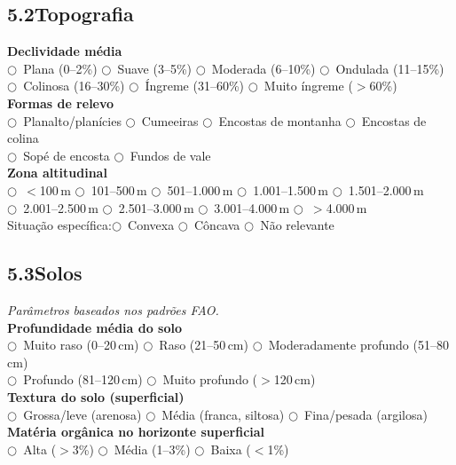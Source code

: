 \subsection{5.2\quad Topografia}

\noindent\textbf{Declividade média}\\
$\bigcirc$~Plana (0--2\%) \quad $\bigcirc$~Suave (3--5\%) \quad $\bigcirc$~Moderada (6--10\%) \quad $\bigcirc$~Ondulada (11--15\%)\\
$\bigcirc$~Colinosa (16--30\%) \quad $\bigcirc$~Íngreme (31--60\%) \quad $\bigcirc$~Muito íngreme ($>$60\%)\\[4pt]
\textbf{Formas de relevo}\\
$\bigcirc$~Planalto/planícies \quad $\bigcirc$~Cumeeiras \quad $\bigcirc$~Encostas de montanha \quad $\bigcirc$~Encostas de colina\\
$\bigcirc$~Sopé de encosta \quad $\bigcirc$~Fundos de vale\\[4pt]
\textbf{Zona altitudinal}\\
$\bigcirc$~$<$100\,m \quad $\bigcirc$~101--500\,m \quad $\bigcirc$~501--1.000\,m \quad $\bigcirc$~1.001--1.500\,m \quad $\bigcirc$~1.501--2.000\,m\\
$\bigcirc$~2.001--2.500\,m \quad $\bigcirc$~2.501--3.000\,m \quad $\bigcirc$~3.001--4.000\,m \quad $\bigcirc$~$>$4.000\,m\\[4pt]
Situação específica:\quad $\bigcirc$~Convexa \quad $\bigcirc$~Côncava \quad $\bigcirc$~Não relevante

\subsection{5.3\quad Solos}
\textit{Parâmetros baseados nos padrões FAO.}\\[4pt]
\textbf{Profundidade média do solo}\\
$\bigcirc$~Muito raso (0--20\,cm) \quad $\bigcirc$~Raso (21--50\,cm) \quad $\bigcirc$~Moderadamente profundo (51--80\,cm)\\
$\bigcirc$~Profundo (81--120\,cm) \quad $\bigcirc$~Muito profundo ($>$120\,cm)\\[4pt]
\textbf{Textura do solo (superficial)}\\
$\bigcirc$~Grossa/leve (arenosa) \quad $\bigcirc$~Média (franca, siltosa) \quad $\bigcirc$~Fina/pesada (argilosa)\\[4pt]
\textbf{Matéria orgânica no horizonte superficial}\\
$\bigcirc$~Alta ($>$3\%) \quad $\bigcirc$~Média (1--3\%) \quad $\bigcirc$~Baixa ($<$1\%)

